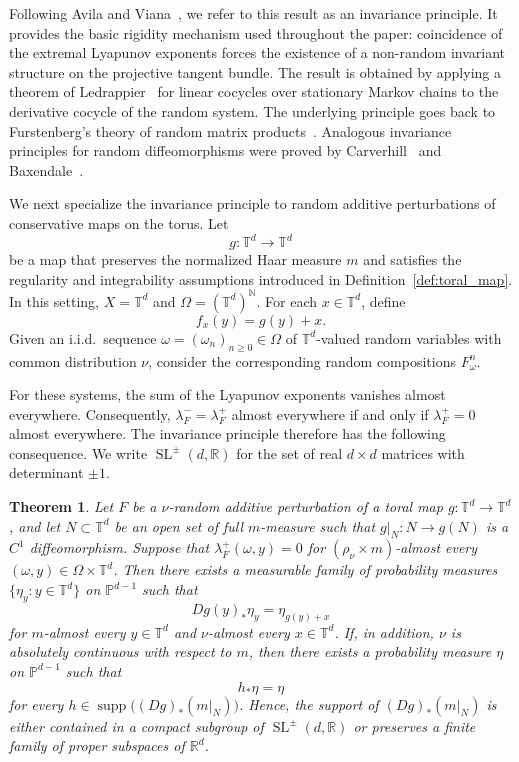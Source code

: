 \documentclass[a4paper,12pt,reqno]{amsart}
\numberwithin{equation}{section}
\newtheorem{theorem}{Theorem}[section]
\newcommand{\Nn}{{\mathbb{N}}}
\newcommand{\Rr}{{\mathbb{R}}}
\newcommand{\Tt}{{\mathbb{T}}}
\def\SL{\operatorname{SL}}
\begin{document}
Following Avila and Viana~\cite{Avila:2010aa}, we refer to this result as an invariance principle. It provides the basic rigidity mechanism used throughout the paper: coincidence of the extremal Lyapunov exponents forces the existence of a non-random invariant structure on the projective tangent bundle. The result is obtained by applying a theorem of Ledrappier~\cite{Ledrappier:1986ue} for linear cocycles over stationary Markov chains to the derivative cocycle of the random system. The underlying principle goes back to Furstenberg's theory of random matrix products~\cite{Furstenberg:1963uq}. Analogous invariance principles for random diffeomorphisms were proved by Carverhill~\cite{carverhill1987furstenberg} and Baxendale~\cite{Baxendale:1989aa}.

We next specialize the invariance principle to random additive perturbations of conservative maps on the torus. Let
\[
g\colon\Tt^d\to\Tt^d
\]
be a map that preserves the normalized Haar measure $m$ and satisfies the regularity and integrability assumptions introduced in Definition~\ref{def:toral_map}. In this setting, $X=\Tt^d$ and $\Omega=(\Tt^d)^{\Nn}$. For each $x\in\Tt^d$, define
\[
f_x(y)=g(y)+x.
\]
Given an i.i.d.\ sequence $\omega=(\omega_n)_{n\geq0} \in \Omega$ of $\Tt^d$-valued random variables with common distribution $\nu$, consider the corresponding random compositions $F_\omega^n$. 

For these systems, the sum of the Lyapunov exponents vanishes almost everywhere. Consequently, $\lambda_F^-=\lambda_F^+$ almost everywhere if and only if $\lambda_F^+=0$ almost everywhere. The invariance principle therefore has the following consequence. We write $\SL^{\pm}(d,\Rr)$ for the set of real $d \times d$ matrices with determinant $\pm 1$.

\begin{theorem}
Let $F$ be a $\nu$-random additive perturbation of a toral map
$g\colon\Tt^d\to\Tt^d$, and let $N\subset\Tt^d$ be an open set of full
$m$-measure such that $g|_N\colon N\to g(N)$ is a $C^1$ diffeomorphism. Suppose that $\lambda_F^+(\omega,y)=0$ for $(\rho_\nu\times m)$-almost every
$(\omega,y)\in\Omega\times\Tt^d$. Then there exists a measurable family
of probability measures $\{\eta_y:y\in\Tt^d\}$ on $\mathbb P^{d-1}$ such
that
\[
Dg(y)_*\eta_y=\eta_{g(y)+x}
\]
for $m$-almost every $y\in\Tt^d$ and $\nu$-almost every $x\in\Tt^d$. If, in addition, $\nu$ is absolutely continuous with respect to $m$, then
there exists a probability measure $\eta$ on $\mathbb P^{d-1}$ such that
\[
h_*\eta=\eta
\]
for every $h\in\operatorname{supp}\bigl((Dg)_*(m|_N)\bigr)$. Hence, the support of $(Dg)_*(m|_N)$ is either contained in a
compact subgroup of $\operatorname{SL}^{\pm}(d,\Rr)$ or preserves a finite family of proper subspaces of $\Rr^d$.
\end{theorem}
\end{document}
